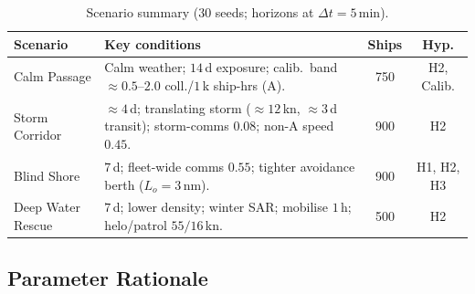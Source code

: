 \documentclass[cameraready]{Interspeech}
\begin{document}
\begin{table}[t]
    \caption{Scenario summary ($30$ seeds; horizons at $\Delta t=5$\,min).}
    \label{tab:scenarios}
    \centering
    \small
    \setlength{\tabcolsep}{4pt}
    \begin{tabularx}{\columnwidth}{@{}l>{\raggedright\arraybackslash}Xcc@{}}
        \toprule
        Scenario & Key conditions & Ships & Hyp. \\
        \midrule
        Calm Passage &
        Calm weather; $14$\,d exposure; calib.\ band ${\approx}0.5$--$2.0$ coll./$1$\,k ship-hrs (A). &
        750 & H2, Calib. \\
        Storm Corridor &
        ${\approx}4$\,d; translating storm (${\approx}12$\,kn, ${\approx}3$\,d transit); storm-comms $0.08$; non-A speed $0.45$. &
        900 & H2 \\
        Blind Shore &
        $7$\,d; fleet-wide comms $0.55$; tighter avoidance berth ($L_o=3$\,nm). &
        900 & H1, H2, H3 \\
        Deep Water Rescue &
        $7$\,d; lower density; winter SAR; mobilise $1$\,h; helo/patrol $55/16$\,kn. &
        500 & H2 \\
        \bottomrule
    \end{tabularx}
\end{table}

\subsection{Parameter Rationale}
\label{sec:param-rationale}
\end{document}
